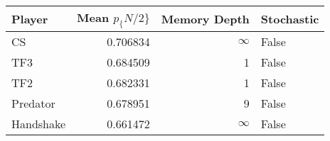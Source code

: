 \begin{tabular}{lrrl}
\toprule
    Player &  Mean $p_\{N/2\}$ &  Memory Depth & Stochastic \\
\midrule
        CS &        0.706834 &            \(\infty\) &      False \\
       TF3 &        0.684509 &             1 &      False \\
       TF2 &        0.682331 &             1 &      False \\
  Predator &        0.678951 &             9 &      False \\
 Handshake &        0.661472 &            \(\infty\) &      False \\
\bottomrule
\end{tabular}
